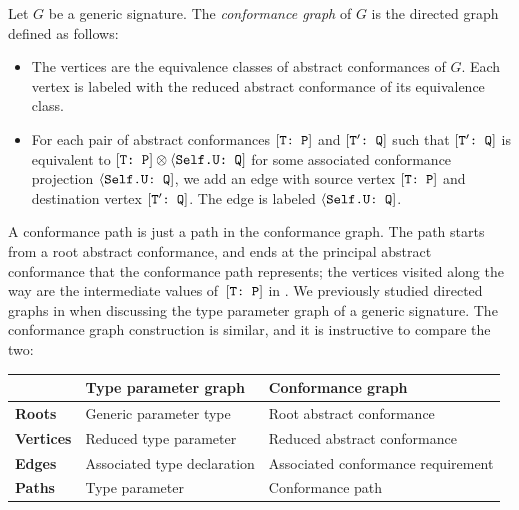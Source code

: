 \documentclass[../generics]{subfiles}
\begin{document}
\begin{definition}
Let $G$ be a generic signature. The \emph{conformance graph} of $G$ is the directed graph defined as follows:
\begin{itemize}
\item The vertices are the equivalence classes of abstract conformances of $G$. Each vertex is labeled with the reduced abstract conformance of its equivalence class.
\item For each pair of abstract conformances $[\texttt{T:~P}]$ and $[\texttt{$\texttt{T}'$:~Q}]$ such that $[\texttt{$\texttt{T}'$:~Q}]$ is equivalent to $[\texttt{T:~P}] \otimes \langle\texttt{Self.U:~Q}]$ for some associated conformance projection $\langle\texttt{Self.U:~Q}]$, we add an edge with source vertex $[\texttt{T:~P}]$ and destination vertex $[\texttt{$\texttt{T}'$:~Q}]$. The edge is labeled $\langle\texttt{Self.U:~Q}]$.
\end{itemize}
\end{definition}
A conformance path is just a path in the conformance graph. The path starts from a root abstract conformance, and ends at the principal abstract conformance that the conformance path represents; the vertices visited along the way are the intermediate values of~$[\texttt{T:~P}]$ in . We previously studied directed graphs in  when discussing the type parameter graph of a generic signature. The conformance graph construction is similar, and it is instructive to compare the two:
\begin{center}
\begin{tabular}{lll}
\toprule
&\textbf{Type parameter graph}&\textbf{Conformance graph}\\
\midrule
\textbf{Roots}&Generic parameter type&Root abstract conformance\\
\textbf{Vertices}&Reduced type parameter&Reduced abstract conformance\\
\textbf{Edges}&Associated type declaration&Associated conformance requirement\\
\textbf{Paths}&Type parameter&Conformance path\\
\bottomrule
\end{tabular}
\end{center}
\end{document}
